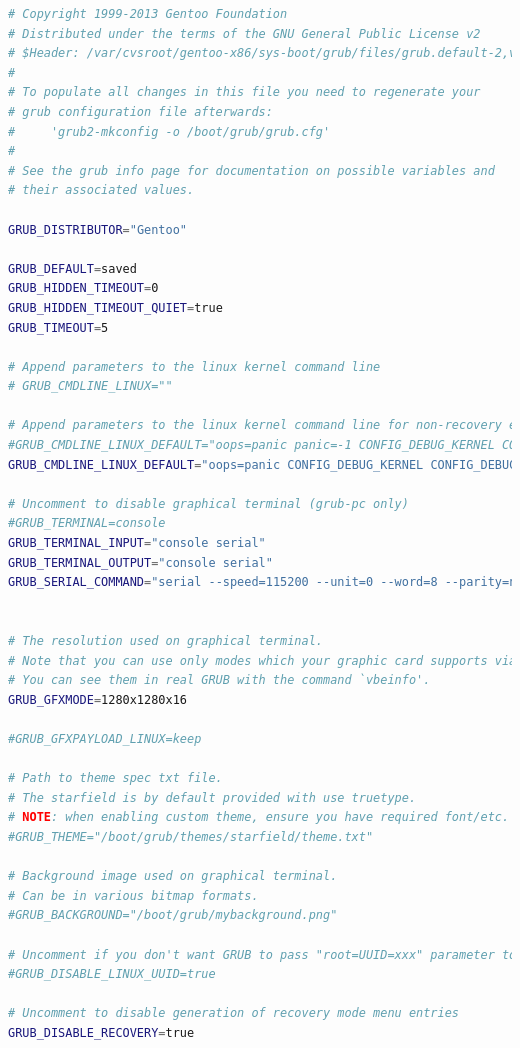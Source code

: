 \documentclass[]{report}
\begin{document}
\begin{lstlisting}[language=bash, style=code, caption=/etc/default/grub]
# Copyright 1999-2013 Gentoo Foundation
# Distributed under the terms of the GNU General Public License v2
# $Header: /var/cvsroot/gentoo-x86/sys-boot/grub/files/grub.default-2,v 1.4 2013/09/21 18:10:55 floppym Exp $
#
# To populate all changes in this file you need to regenerate your
# grub configuration file afterwards:
#     'grub2-mkconfig -o /boot/grub/grub.cfg'
#
# See the grub info page for documentation on possible variables and
# their associated values. 

GRUB_DISTRIBUTOR="Gentoo"

GRUB_DEFAULT=saved
GRUB_HIDDEN_TIMEOUT=0
GRUB_HIDDEN_TIMEOUT_QUIET=true
GRUB_TIMEOUT=5

# Append parameters to the linux kernel command line
# GRUB_CMDLINE_LINUX=""

# Append parameters to the linux kernel command line for non-recovery entries
#GRUB_CMDLINE_LINUX_DEFAULT="oops=panic panic=-1 CONFIG_DEBUG_KERNEL CONFIG_DEBUG_STACKOVERFLOW CONFIG_DEBUG_STACK_USAGE"
GRUB_CMDLINE_LINUX_DEFAULT="oops=panic CONFIG_DEBUG_KERNEL CONFIG_DEBUG_STACKOVERFLOW CONFIG_DEBUG_STACK_USAGE console=tty0 console=ttyS0,115200n8 maxcpus=1"

# Uncomment to disable graphical terminal (grub-pc only)
#GRUB_TERMINAL=console
GRUB_TERMINAL_INPUT="console serial"
GRUB_TERMINAL_OUTPUT="console serial"
GRUB_SERIAL_COMMAND="serial --speed=115200 --unit=0 --word=8 --parity=no --stop=1"


# The resolution used on graphical terminal.
# Note that you can use only modes which your graphic card supports via VBE.
# You can see them in real GRUB with the command `vbeinfo'.
GRUB_GFXMODE=1280x1280x16

#GRUB_GFXPAYLOAD_LINUX=keep

# Path to theme spec txt file.
# The starfield is by default provided with use truetype.
# NOTE: when enabling custom theme, ensure you have required font/etc.
#GRUB_THEME="/boot/grub/themes/starfield/theme.txt"

# Background image used on graphical terminal.
# Can be in various bitmap formats.
#GRUB_BACKGROUND="/boot/grub/mybackground.png"

# Uncomment if you don't want GRUB to pass "root=UUID=xxx" parameter to kernel
#GRUB_DISABLE_LINUX_UUID=true

# Uncomment to disable generation of recovery mode menu entries
GRUB_DISABLE_RECOVERY=true
\end{lstlisting}
\end{document}

